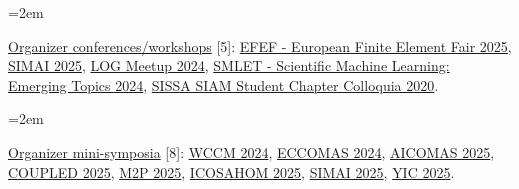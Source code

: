 \documentclass[
  usegeometry%
]{scrartcl}
\newcommand{\Description}[1]{\hangindent=2em\hangafter=0\noindent\raggedright\footnotesize{#1}\par\normalsize\vspace{1em}} %
\begin{document}
\begin{cv}{}
\Description{\underline{Organizer conferences/workshops} [5]: \href{https://indico.sissa.it/event/153/}{EFEF - European Finite Element Fair 2025}, \href{https://simai2025.cimne.com}{SIMAI 2025}, \href{https://sites.google.com/student.unisi.it/log24siena/home-page}{LOG Meetup 2024}, \href{https://indico.sissa.it/event/107/}{SMLET - Scientific Machine Learning: Emerging Topics 2024}, \href{https://www.math.sissa.it/seminar/siam-chapter-colloquia-2020}{SISSA SIAM Student Chapter Colloquia 2020}.}
\Description{\underline{Organizer mini-symposia} [8]: \href{https://www.wccm2024.org}{WCCM 2024}, \href{https://eccomas2024.org}{ECCOMAS 2024}, \href{https://dte_aicomas_2025.iacm.info}{AICOMAS 2025}, \href{https://coupled2025.cimne.com}{COUPLED 2025}, \href{https://www.m2p2025.com/m2p2025}{M2P 2025}, \href{https://icosahom2025.org}{ICOSAHOM 2025}, \href{https://simai2025.cimne.com}{SIMAI 2025}, \href{https://yic2025.cimne.com}{YIC 2025}.}




\end{cv}
\end{document}
